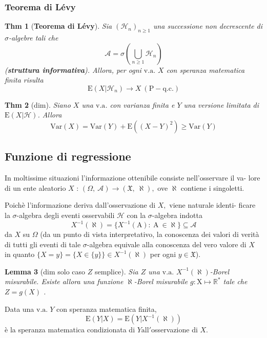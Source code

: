\documentclass[a4paper,11pt]{article}
\theoremstyle{plain}
\newtheorem{thm}{Thm}[section]
\newtheorem{lem}[thm]{Lemma}
\theoremstyle{definition}
\theoremstyle{remark}
\begin{document}
\subsubsection{Teorema di Lévy}
\begin{thm}[\textbf{Teorema di Lévy}]
Sia $(\mathcal{H}_{n})_{n\geq 1}$ una successione non decrescente di $\sigma$-algebre tali che
$$
\mathcal{A}=\sigma(\bigcup_{n\geq 1}\mathcal{H}_{n})
$$
(\textbf{struttura informativa}). Allora, per ogni $\mathrm{v}.\mathrm{a}.$ $X$ con speranza matematica finita risulta
$$
\mathrm{E}(X|\mathcal{H}_{n})\rightarrow X\ (\mathrm{P}- \mathrm{q}.\mathrm{c}.)
$$
\end{thm}

\begin{thm}[dim]
Siano $X$ una $\mathrm{v}.\mathrm{a}$. con varianza finita  e $Y$ una versione limitata di $\mathrm{E}(X|\mathcal{H})$. Allora
$$
\mathrm{V}\mathrm{a}\mathrm{r} (X)=\mathrm{V}\mathrm{a}\mathrm{r}(Y)+\mathrm{E}((X-Y)^{2})\geq \mathrm{V}\mathrm{a}\mathrm{r}(Y)
$$
\end{thm}

\subsection{Funzione di regressione}
In moltissime situazioni l'informazione ottenibile consiste nell'osservare il va- lore di un ente aleatorio $X$ : $(\Omega,\ \mathcal{A})\rightarrow(\mathfrak{X},\ \aleph),$ ove $ \aleph$ contiene $\mathrm{i}$ singoletti.

\noindent
Poichè l'informazione deriva dall'osservazione di $X,$ viene naturale identi- ficare la $\sigma$-algebra degli eventi osservabili $\mathcal{H}$ con la $\sigma$-algebra indotta
$$
X^{-1}(\aleph)=\{X^{-1}(\mathrm{A}):\ \mathrm{A}\ \in\aleph\}\subseteq \mathcal{A}
$$
da $X$ su $\Omega$ (da un punto di vista interpretativo, la conoscenza dei valori di verità di tutti gli eventi di tale $\sigma$-algebra equivale alla conoscenza del vero valore di $X$ in quanto $\{X=y\}=\{X\in\{y\}\}\in X^{-1}(\aleph)$ per ogni $y\in \mathfrak{X}$).


\begin{lem}[dim solo caso $Z$ semplice] Sia $Z$ una $\mathrm{v}.\mathrm{a}.$ $X^{-1}(\aleph)$-Borel misurabile. Esiste allora una funzione $\aleph$-Borel misurabile $g:\mathrm{X}\mapsto \mathbb{R}^{*}$ tale che $Z=g(X)$ .
\end{lem}

\noindent
Data una $\mathrm{v}.\mathrm{a}. \; Y$ con speranza matematica finita,
$$
\mathrm{E}(Y|X)=\mathrm{E}(Y|X^{-1}(\aleph))
$$
è la speranza matematica condizionata di $Y\mathrm{a}\mathrm{l}\mathrm{l}'$osservazione di $X.$
\end{document}
